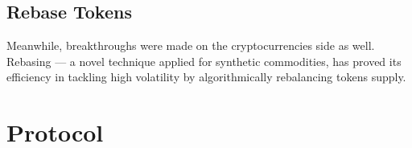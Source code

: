 \documentclass{article}
\begin{document}
\subsection{Rebase Tokens}

Meanwhile, breakthroughs were made on the cryptocurrencies side as well. Rebasing --- a novel technique applied for synthetic commodities, has proved its efficiency in tackling high volatility by algorithmically rebalancing tokens supply.

\section{Protocol}



\end{document}
